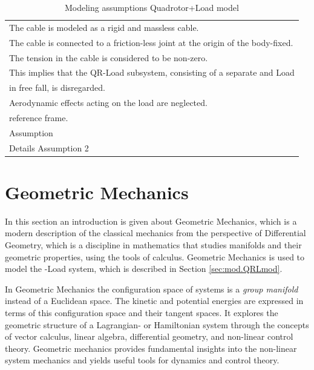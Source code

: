\begin{table}[h!]
	\centering
	\begin{tabular}{|p{\textwidth}|}
		\hline
		\tabitem The cable is modeled as a rigid and massless cable. \\
		\tabitem The cable is connected to a friction-less joint at the origin of the body-fixed. \\
		\tabitem The tension in the cable is considered to be non-zero.\\
		\hspace{4mm} This implies that the QR-Load subsystem, consisting of a separate \a{qr} and Load\\
		\hspace{4mm} in free fall, is disregarded.\\		 
		\tabitem Aerodynamic effects acting on the load are neglected.\\
		\hspace{4mm} reference frame.\\
		\tabitem Assumption \\
		\hspace{4mm} Details Assumption 2\\
		\hline
	\end{tabular}
	\caption{Modeling assumptions Quadrotor+Load model}
	\label{tab:mod.assumptionsQRL}
\end{table}


\section{Geometric Mechanics}\label{sec:mod.geometric}

In this section an introduction is given about Geometric Mechanics, which is a modern description of the classical mechanics from the perspective of Differential Geometry, which is a discipline in mathematics that studies manifolds and their geometric properties, using the tools of calculus. Geometric Mechanics is used to model the -Load system, which is described in Section \ref{sec:mod.QRLmod}.

In Geometric Mechanics the configuration space of systems is a \textit{group manifold} instead of a Euclidean space. The kinetic and potential energies are expressed in terms of this configuration space and their tangent spaces. It explores the geometric structure of a Lagrangian- or Hamiltonian system through the concepts of vector calculus, linear algebra, differential geometry, and non-linear control theory. Geometric mechanics provides fundamental insights into the non-linear system mechanics and yields useful tools for dynamics and control theory.


